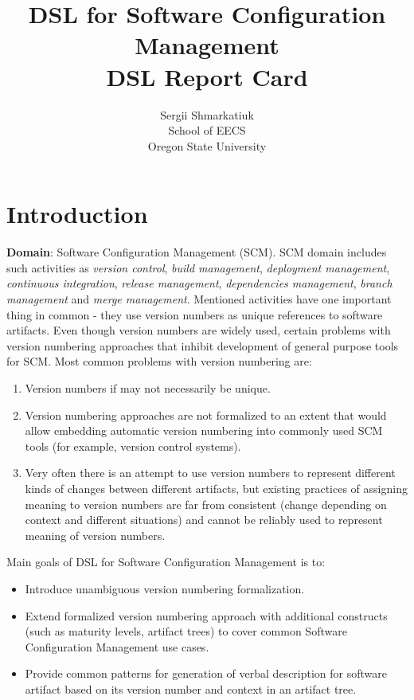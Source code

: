 \documentclass[11pt]{article}
\begin{document}
\title{\textbf{DSL for Software Configuration Management}
\\ DSL Report Card}

\author{Sergii Shmarkatiuk \\
School of EECS \\ 
Oregon State University
}

\maketitle


\section{Introduction}
\label{sec:intro}

\textbf{Domain}: Software Configuration Management (SCM). SCM domain includes such activities as \textit{version control}, \textit{build management}, \textit{deployment management}, \textit{continuous integration}, \textit{release management}, \textit{dependencies management}, \textit{branch management} and \textit{merge management}. Mentioned activities have one important thing in common - they use version numbers as unique references to software artifacts. Even though version numbers are widely used, certain problems with version numbering approaches that inhibit development of general purpose tools for SCM. Most common problems with version numbering are:
\begin{enumerate}
 \item Version numbers if may not necessarily be unique. 
 \item Version numbering approaches are not formalized to an extent that would allow embedding automatic version numbering into commonly used SCM tools (for example, version control systems).
 \item Very often there is an attempt to use version numbers to represent different kinds of changes between different artifacts, but existing practices of assigning meaning to version numbers are far from consistent (change depending on context and different situations) and cannot be reliably used to represent meaning of version numbers.
\end{enumerate}

Main goals of DSL for Software Configuration Management is to:
\begin{itemize}
 \item Introduce unambiguous version numbering formalization.
 \item Extend formalized version numbering approach with additional constructs (such as maturity levels, artifact trees) to cover common Software Configuration Management use cases.
 \item Provide common patterns for generation of verbal description for software artifact based on its version number and context in an artifact tree. 
 \end{itemize} 
\end{document}
